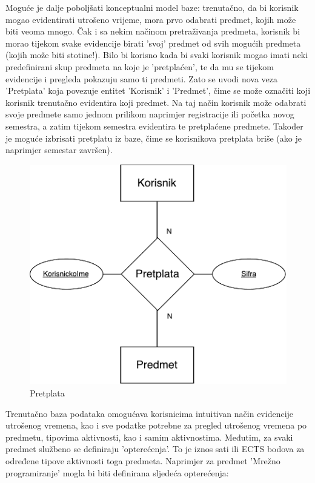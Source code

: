 \documentclass[times, utf8, zavrsni]{fer}
\begin{document}
Moguće je dalje poboljšati konceptualni model baze: trenutačno, da bi korisnik mogao evidentirati utrošeno vrijeme, mora prvo odabrati predmet, kojih može biti veoma mnogo. Čak i sa nekim načinom pretraživanja predmeta, korisnik bi morao tijekom svake evidencije birati 'svoj' predmet od svih mogućih predmeta (kojih može biti stotine!). Bilo bi korisno kada bi svaki korisnik mogao imati neki predefinirani skup predmeta na koje je 'pretplaćen', te da mu se tijekom evidencije i pregleda pokazuju samo ti predmeti. Zato se uvodi nova veza 'Pretplata' koja povezuje entitet 'Korisnik' i 'Predmet', čime se može označiti koji korisnik trenutačno evidentira koji predmet. Na taj način korisnik može odabrati svoje predmete samo jednom prilikom naprimjer registracije ili početka novog semestra, a zatim tijekom semestra evidentira te pretplaćene predmete. Također je moguće izbrisati pretplatu iz baze, čime se korisnikova pretplata briše (ako je naprimjer semestar završen).\\

\begin{figure}[H]
\centering
\includegraphics[scale=0.8]{img/pretplata.pdf}
\caption{Pretplata}
\label{fig:pretplata}
\end{figure}
\clearpage

Trenutačno baza podataka omogućava korisnicima intuitivan način evidencije utrošenog vremena, kao i sve podatke potrebne za pregled utrošenog vremena po predmetu, tipovima aktivnosti, kao i samim aktivnostima. Međutim, za svaki predmet službeno se definiraju 'opterećenja'. To je iznos sati ili ECTS bodova za određene tipove aktivnosti toga predmeta. Naprimjer za predmet 'Mrežno programiranje' mogla bi biti definirana sljedeća opterećenja:
\end{document}
